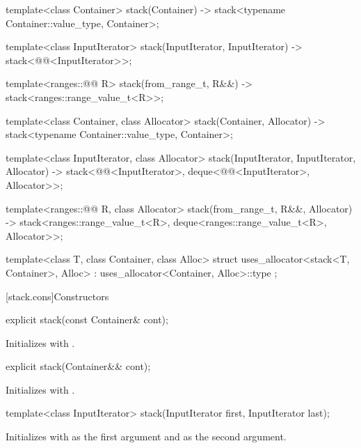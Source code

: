 \begin{codeblock}
{  template<class Container>
    stack(Container) -> stack<typename Container::value_type, Container>;

  template<class InputIterator>
    stack(InputIterator, InputIterator) -> stack<@@<InputIterator>>;

  template<ranges::@@ R>
    stack(from_range_t, R&&) -> stack<ranges::range_value_t<R>>;

  template<class Container, class Allocator>
    stack(Container, Allocator) -> stack<typename Container::value_type, Container>;

  template<class InputIterator, class Allocator>
    stack(InputIterator, InputIterator, Allocator)
      -> stack<@@<InputIterator>, deque<@@<InputIterator>,
               Allocator>>;

  template<ranges::@@ R, class Allocator>
    stack(from_range_t, R&&, Allocator)
      -> stack<ranges::range_value_t<R>, deque<ranges::range_value_t<R>, Allocator>>;

  template<class T, class Container, class Alloc>
    struct uses_allocator<stack<T, Container>, Alloc>
      : uses_allocator<Container, Alloc>::type { };
}
\end{codeblock}

[stack.cons]{Constructors}

%
\begin{itemdecl}
explicit stack(const Container& cont);
\end{itemdecl}

\begin{itemdescr}
\pnum
\effects
Initializes  with .
\end{itemdescr}

%
\begin{itemdecl}
explicit stack(Container&& cont);
\end{itemdecl}

\begin{itemdescr}
\pnum
\effects
Initializes  with .
\end{itemdescr}

%
\begin{itemdecl}
template<class InputIterator>
  stack(InputIterator first, InputIterator last);
\end{itemdecl}

\begin{itemdescr}
\pnum
\effects
Initializes  with
 as the first argument and  as the second argument.
\end{itemdescr}

